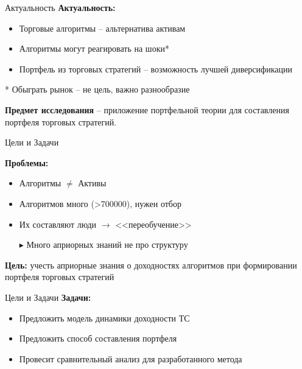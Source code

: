 \documentclass[14pt]{beamer}
\title{\small{\thesisTitle}}
\author{\small{%
\emph{Выступающий:}~\thesisAuthorShort\\%
\emph{Руководитель:}~\supervisorRegaliaShort~\supervisorFioShort}\\%
\vspace{30pt}%
\thesisOrganization%
\vspace{20pt}%
}
\date{\small{\thesisCity, \thesisYear}}
\begin{document}
\maketitle
\begin{frame}{Актуальность}
\textbf{Актуальность:}
\begin{itemize}
	\item Торговые алгоритмы -- альтернатива активам
	\item Алгоритмы могут реагировать на шоки*
	\item Портфель из торговых стратегий -- возможность лучшей диверсификации
\end{itemize}
* Обыграть рынок -- не цель, важно разнообразие
\vspace{\baselineskip}

\textbf{Предмет исследования} -- приложение портфельной теории для составления портфеля торговых стратегий.
\end{frame}
\begin{frame}{Цели и Задачи}

\textbf{Проблемы:}
\begin{itemize}
	\item Алгоритмы $\ne$ Активы
	\item Алгоритмов много (>700000), нужен отбор
	\item Их составляют люди $\rightarrow$ <<переобучение>>
	\item[$\blacktriangleright$] Много априорных знаний не про структуру
\end{itemize}
\vspace{\baselineskip}

\textbf{Цель:} учесть априорные знания о доходностях алгоритмов при формировании портфеля торговых стратегий
\end{frame}
\begin{frame}{Цели и Задачи}
\textbf{Задачи:}
\begin{itemize}
	\item Предложить модель динамики доходности ТС
	\item Предложить способ составления портфеля
	\item Провесит сравнительный анализ для разработанного метода
\end{itemize}
\end{frame}
\end{document}
